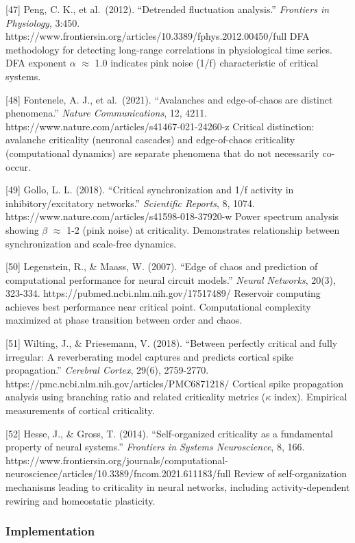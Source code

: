 \documentclass[
]{article}
\begin{document}
{[}47{]} Peng, C. K., et al.~(2012). ``Detrended fluctuation analysis.''
\emph{Frontiers in Physiology}, 3:450.
https://www.frontiersin.org/articles/10.3389/fphys.2012.00450/full DFA
methodology for detecting long-range correlations in physiological time
series. DFA exponent $\alpha$ $\approx$ 1.0 indicates pink noise (1/f) characteristic
of critical systems.

{[}48{]} Fontenele, A. J., et al.~(2021). ``Avalanches and edge-of-chaos
are distinct phenomena.'' \emph{Nature Communications}, 12, 4211.
https://www.nature.com/articles/s41467-021-24260-z Critical distinction:
avalanche criticality (neuronal cascades) and edge-of-chaos criticality
(computational dynamics) are separate phenomena that do not necessarily
co-occur.

{[}49{]} Gollo, L. L. (2018). ``Critical synchronization and 1/f
activity in inhibitory/excitatory networks.'' \emph{Scientific Reports},
8, 1074. https://www.nature.com/articles/s41598-018-37920-w Power
spectrum analysis showing $\beta$ $\approx$ 1-2 (pink noise) at criticality.
Demonstrates relationship between synchronization and scale-free
dynamics.

{[}50{]} Legenstein, R., \& Maass, W. (2007). ``Edge of chaos and
prediction of computational performance for neural circuit models.''
\emph{Neural Networks}, 20(3), 323-334.
https://pubmed.ncbi.nlm.nih.gov/17517489/ Reservoir computing achieves
best performance near critical point. Computational complexity maximized
at phase transition between order and chaos.

{[}51{]} Wilting, J., \& Priesemann, V. (2018). ``Between perfectly
critical and fully irregular: A reverberating model captures and
predicts cortical spike propagation.'' \emph{Cerebral Cortex}, 29(6),
2759-2770. https://pmc.ncbi.nlm.nih.gov/articles/PMC6871218/ Cortical
spike propagation analysis using branching ratio and related criticality
metrics ($\kappa$ index). Empirical measurements of cortical criticality.

{[}52{]} Hesse, J., \& Gross, T. (2014). ``Self-organized criticality as
a fundamental property of neural systems.'' \emph{Frontiers in Systems
Neuroscience}, 8, 166.
https://www.frontiersin.org/journals/computational-neuroscience/articles/10.3389/fncom.2021.611183/full
Review of self-organization mechanisms leading to criticality in neural
networks, including activity-dependent rewiring and homeostatic
plasticity.

\hypertarget{implementation}{%
\subsubsection{Implementation}\label{implementation}}
\end{document}
